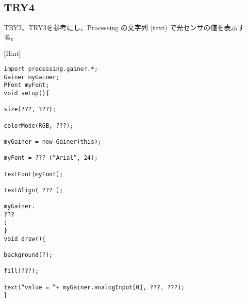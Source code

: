 \documentclass[11pt,a4paper]{jarticle}
\begin{document}
 

\subsection*{TRY4}
TRY2、TRY3を参考にし、Processing の文字列 (text) で光センサの値を表示する。

[Hint]
\begin{lstlisting}
import processing.gainer.*;
Gainer myGainer;
PFont myFont;
void setup(){
	
size(???, ???);
	
colorMode(RGB, ???);
	
myGainer = new Gainer(this);
	
myFont = ??? (“Arial”, 24);
	
textFont(myFont);
	
textAlign( ??? );
	
myGainer.
???
;
}
void draw(){
	
background(?);
	
fill(???);
	
text(“value = ”+ myGainer.analogInput[0], ???, ???);
}
 
\end{lstlisting}
\end{document}
